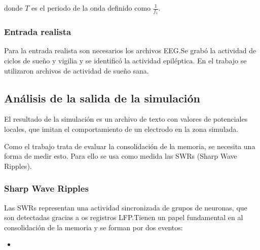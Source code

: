 \documentclass[12pt, letterpaper]{article}
\begin{document}
donde $T$ es el periodo de la onda definido como $\frac{1}{f_1}$. 

\subsubsection{Entrada realista}
Para la entrada realista son necesarios los archivos EEG.\@ Se grabó la actividad de ciclos de sueño y vigilia y se identificó la actividad epiléptica. En el trabajo se utilizaron archivos de actividad de sueño sana.

\subsection{Análisis de la salida de la simulación}
El resultado de la simulación es un archivo de texto con valores de potenciales locales, que imitan el comportamiento de un electrodo en la zona simulada. 

Como el trabajo trata de evaluar la consolidación de la memoria, se necesita una forma de medir esto. Para ello se usa como medida las SWRs (Sharp Wave Ripples).

\subsubsection{Sharp Wave Ripples}
Las SWRs representan una actividad sincronizada de grupos de neuronas, que son detectadas gracias a os registros LFP.\@ Tienen un papel fundamental en al consolidación de la memoria y se forman por dos eventos:
\begin{itemize}
    \item 
\end{itemize}
\end{document}
